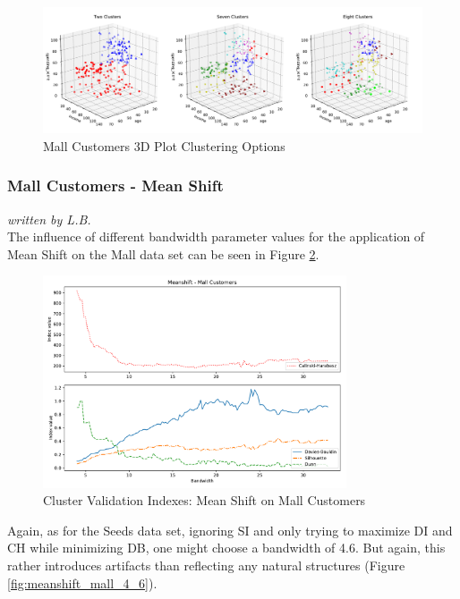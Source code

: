 \begin{figure}[H]
\begin{center}
\includegraphics[width=1.0\textwidth]{images/kmeans_mall_3d_multi.pdf}
\end{center}
\caption{Mall Customers 3D Plot Clustering Options}
\label{fig:kmeans_customers_3d_multi}
\end{figure}
\vspace{-0.5cm}


\subsubsection{Mall Customers - Mean Shift}
\textit{written by L.B.}\\

The influence of different bandwidth parameter values for the application of Mean Shift on the Mall data set can be seen in Figure \ref{fig:meanshift_mall}.

\begin{figure}[!ht]
\begin{center}
\includegraphics[width=0.8\textwidth]{images/Meanshift_-_Mall_Customers.pdf}
\end{center}
\caption{Cluster Validation Indexes: Mean Shift on Mall Customers}
\label{fig:meanshift_mall}
\end{figure}
Again, as for the Seeds data set, ignoring SI and only trying to maximize DI and CH while minimizing DB, one might choose a bandwidth of 4.6. But again, this rather introduces artifacts than reflecting any natural structures (Figure \ref{fig:meanshift_mall_4_6}).

